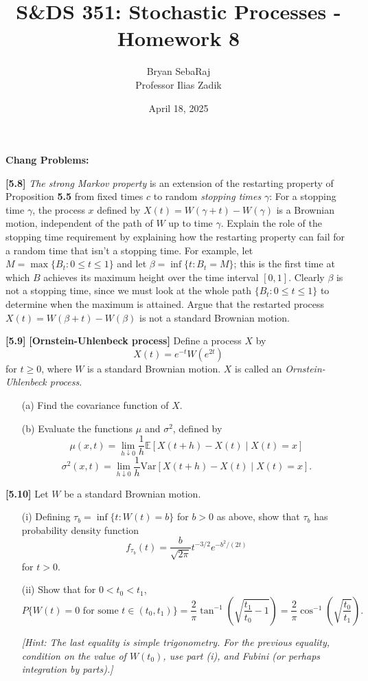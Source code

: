 \documentclass{article}
\title{S\&DS 351: Stochastic Processes - Homework 8}
\author{Bryan SebaRaj \\[0.8em] Professor Ilias Zadik}
\date{April 18, 2025}
\begin{document}
\maketitle

\textbf{Chang Problems:}

\textbf{[5.8]} \textit{The strong Markov property} is an extension of
the restarting property of Proposition \textbf{5.5} from fixed times
$c$ to random \textit{stopping times} $\gamma$: For a stopping time
$\gamma$, the process $x$ defined by $X(t) = W(\gamma + t) -
W(\gamma)$ is a Brownian motion, independent of the path of $W$ up to
time $\gamma$. Explain the role of the stopping time requirement by
explaining how the restarting property can fail for a random time
that isn’t a stopping time. For example, let $M = \max\{B_t : 0 \leq
t \leq 1\}$ and let $\beta = \inf\{t : B_t = M\}$; this is the first
time at which $B$ achieves its maximum height over the time interval
$[0,1]$. Clearly $\beta$ is not a stopping time, since we must look
at the whole path $\{B_t : 0 \leq t \leq 1\}$ to determine when the
maximum is attained. Argue that the restarted process $X(t) = W(\beta
+ t) - W(\beta)$ is not a standard Brownian motion.




\textbf{[5.9]} \textbf{[Ornstein-Uhlenbeck process]} Define a process $X$ by
\[
X(t) = e^{-t}W(e^{2t})
\]
for $t \geq 0$, where $W$ is a standard Brownian motion. $X$ is called an \textit{Ornstein-Uhlenbeck process}.

\begin{enumerate}
    \item[(a)] Find the covariance function of $X$.
    \item[(b)] Evaluate the functions $\mu$ and $\sigma^2$, defined by
    \[
    \mu(x,t) = \lim_{h \downarrow 0} \frac{1}{h} \mathbb{E}[X(t+h) - X(t) \mid X(t) = x]
    \]
    \[
    \sigma^2(x,t) = \lim_{h \downarrow 0} \frac{1}{h} \mathrm{Var}[X(t+h) - X(t) \mid X(t) = x].
    \]
\end{enumerate}



\textbf{[5.10]} Let $W$ be a standard Brownian motion.

\begin{enumerate}
    \item[(i)] Defining $\tau_b = \inf\{t : W(t) = b\}$ for $b > 0$ as above, show that $\tau_b$ has probability density function
    \[
    f_{\tau_b}(t) = \frac{b}{\sqrt{2\pi}} t^{-3/2} e^{-b^2/(2t)}
    \]
    for $t > 0$.
    
    \item[(ii)] Show that for $0 < t_0 < t_1$,
    \[
    P\{W(t) = 0 \text{ for some } t \in (t_0, t_1)\} = \frac{2}{\pi} \tan^{-1} \left( \sqrt{\frac{t_1}{t_0} - 1} \right) = \frac{2}{\pi} \cos^{-1} \left( \sqrt{\frac{t_0}{t_1}} \right).
    \]
    
    \textit{[Hint: The last equality is simple trigonometry. For the previous equality, condition on the value of $W(t_0)$, use part (i), and Fubini (or perhaps integration by parts).]}
\end{enumerate}
\end{document}
